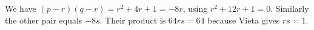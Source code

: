 We have $(p-r)(q-r)=r^2+4r+1=-8r$, using $r^2+12r+1=0$. Similarly the other pair equals $-8s$. Their product is $64rs=\boxed{64}$ because Vieta gives $rs=1$.
